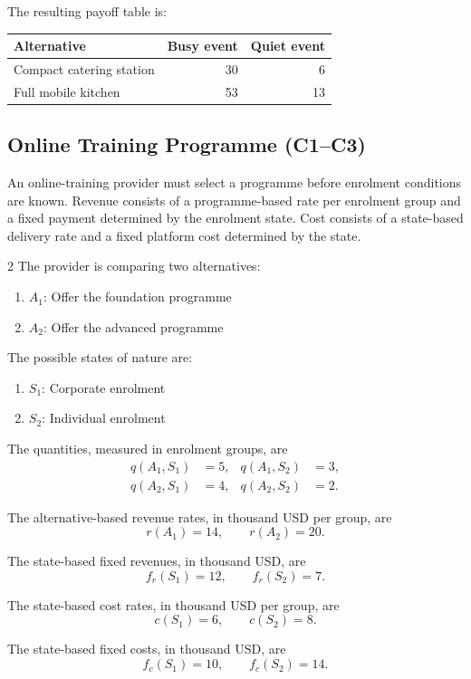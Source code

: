 The resulting payoff table is:

\begin{center}
	\begin{tabular}{lrr}
		\toprule
		Alternative & Busy event & Quiet event \\
		\midrule
		Compact catering station & 30 & 6 \\
		Full mobile kitchen & 53 & 13 \\
		\bottomrule
	\end{tabular}
\end{center}


\subsection{Online Training Programme (C1--C3)}
\label{sec:problem11-online-training-programme-c1-c3}

An online-training provider must select a programme before enrolment conditions
are known. Revenue consists of a programme-based rate per enrolment group and
a fixed payment determined by the enrolment state. Cost consists of a
state-based delivery rate and a fixed platform cost determined by the state.

\begin{multicols}{2}
	The provider is comparing two alternatives:
	\begin{enumerate}[label=\arabic*.]
		\item \(A_1\): Offer the foundation programme
		\item \(A_2\): Offer the advanced programme
	\end{enumerate}
	
	The possible states of nature are:
	\begin{enumerate}[label=\arabic*.]
		\item \(S_1\): Corporate enrolment
		\item \(S_2\): Individual enrolment
	\end{enumerate}
	
	\columnbreak
	
	The quantities, measured in enrolment groups, are
	\[
	\begin{aligned}
		q(A_1,S_1)&=5,
		&
		q(A_1,S_2)&=3,
		\\
		q(A_2,S_1)&=4,
		&
		q(A_2,S_2)&=2.
	\end{aligned}
	\]
	
	The alternative-based revenue rates, in thousand USD per group, are
	\[
	r(A_1)=14,
	\qquad
	r(A_2)=20.
	\]
	
	The state-based fixed revenues, in thousand USD, are
	\[
	f_r(S_1)=12,
	\qquad
	f_r(S_2)=7.
	\]
	
	The state-based cost rates, in thousand USD per group, are
	\[
	c(S_1)=6,
	\qquad
	c(S_2)=8.
	\]
	
	The state-based fixed costs, in thousand USD, are
	\[
	f_c(S_1)=10,
	\qquad
	f_c(S_2)=14.
	\]
\end{multicols}

